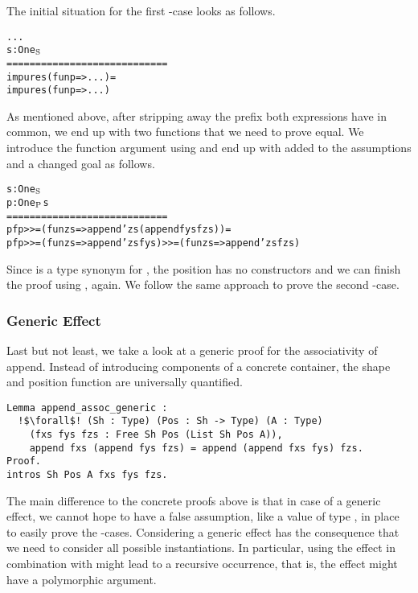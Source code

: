 The initial situation for the first \--case looks as follows.

\begin{alltt}
  ...
  s : One\(\sb{\text{S}}\)
  ============================
  impure s (fun p => ...) =
  impure s (fun p => ...)
\end{alltt}

As mentioned above, after stripping away the prefix both expressions have in common, we end up with two functions that we need to prove equal.
We introduce the function argument  using  and end up with  added to the assumptions and a changed goal as follows.

\begin{alltt}
  s : One\(\sb{\text{S}}\)
  p : One\(\sb{\text{P}}\) s
  ============================
  pf p >>= (fun zs => append' zs (append fys fzs)) =
  pf p >>= (fun zs => append' zs fys) >>= (fun zs => append' zs fzs)
\end{alltt}

Since  is a type synonym for , the position  has no constructors and we can finish the proof using , again.
We follow the same approach to prove the second \--case.

\subsubsection{Generic Effect}
Last but not least, we take a look at a generic proof for the associativity of append. Instead of introducing components of a concrete container, the shape  and position function  are universally quantified.

\begin{verbatim}
Lemma append_assoc_generic :
  !$\forall$! (Sh : Type) (Pos : Sh -> Type) (A : Type)
    (fxs fys fzs : Free Sh Pos (List Sh Pos A)),
    append fxs (append fys fzs) = append (append fxs fys) fzs.
Proof.
intros Sh Pos A fxs fys fzs.
\end{verbatim}

The main difference to the concrete proofs above is that in case of a generic effect, we cannot hope to have a false assumption, like a value of type , in place to easily prove the \--cases.
Considering a generic effect has the consequence that we need to consider all possible instantiations.
In particular, using the effect in combination with  might lead to a recursive occurrence, that is, the effect might have a polymorphic argument.

